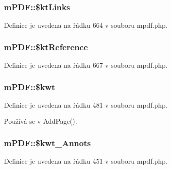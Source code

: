 \hypertarget{classm_p_d_f_a2deca48adce1e6d5e528e21ccb28764e}{
\subsubsection[{\$kt\-Links}]{\setlength{\rightskip}{0pt plus 5cm}m\-P\-D\-F\-::\$kt\-Links}}\label{classm_p_d_f_a2deca48adce1e6d5e528e21ccb28764e}


Definice je uvedena na řádku 664 v souboru mpdf.\-php.

\hypertarget{classm_p_d_f_a4c49c772c0c36ef2eb64006871126bb7}{
\subsubsection[{\$kt\-Reference}]{\setlength{\rightskip}{0pt plus 5cm}m\-P\-D\-F\-::\$kt\-Reference}}\label{classm_p_d_f_a4c49c772c0c36ef2eb64006871126bb7}


Definice je uvedena na řádku 667 v souboru mpdf.\-php.

\hypertarget{classm_p_d_f_af4cf0c5ebcbcb6cf1fb0d4ebb16170c7}{
\subsubsection[{\$kwt}]{\setlength{\rightskip}{0pt plus 5cm}m\-P\-D\-F\-::\$kwt}}\label{classm_p_d_f_af4cf0c5ebcbcb6cf1fb0d4ebb16170c7}


Definice je uvedena na řádku 481 v souboru mpdf.\-php.



Používá se v Add\-Page().

\hypertarget{classm_p_d_f_a11f3e50684e605438a5d8e13cbc034b7}{
\subsubsection[{\$kwt\-\_\-\-Annots}]{\setlength{\rightskip}{0pt plus 5cm}m\-P\-D\-F\-::\$kwt\-\_\-\-Annots}}\label{classm_p_d_f_a11f3e50684e605438a5d8e13cbc034b7}


Definice je uvedena na řádku 451 v souboru mpdf.\-php.

